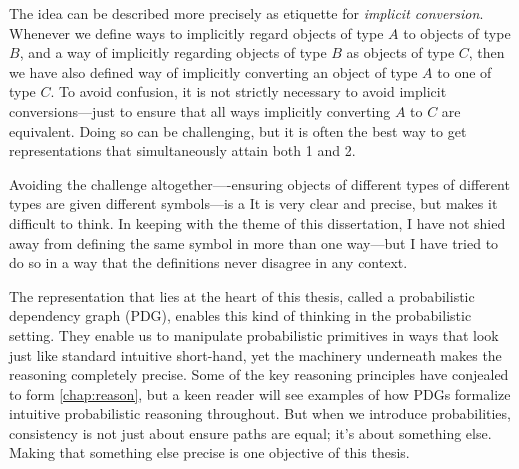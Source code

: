 The idea can be described more precisely as etiquette for \emph{implicit conversion}.
Whenever we define ways to implicitly regard objects of type $A$ to objects of type $B$, and a way of implicitly regarding objects of type
    $B$ as objects of type $C$, then 
    we have also defined way of implicitly converting an object of type $A$ to one of type $C$.
%
To avoid confusion, it is not strictly necessary to avoid implicit conversions---just to ensure that all ways implicitly converting $A$ to $C$ are equivalent. 
%
Doing so can be challenging, but it is often the best way to get representations that simultaneously attain both 1 and 2. 
%

Avoiding the challenge altogether----ensuring objects of different types of different types are given different symbols---is 
a
It is very clear and precise, but makes it difficult to think. 
%
In keeping with the theme of this dissertation, I have not shied away from defining the same symbol in more than one way---but I have tried to do so in a way that the definitions never disagree in any context. 
%

    

The representation that lies at the heart of this thesis, called a probabilistic dependency graph (PDG), enables this kind of thinking in the probabilistic setting.
They enable us to manipulate probabilistic primitives in ways that look just like standard intuitive short-hand, yet the machinery underneath makes the reasoning completely precise.
Some of the key reasoning principles have conjealed to form \cref{chap:reason},
but a keen reader will see examples of how PDGs formalize intuitive probabilistic reasoning throughout. 
But when we introduce probabilities, consistency is not just about ensure paths are equal;
 it's about something else. 
Making that something else precise is one objective of this thesis. 
%


